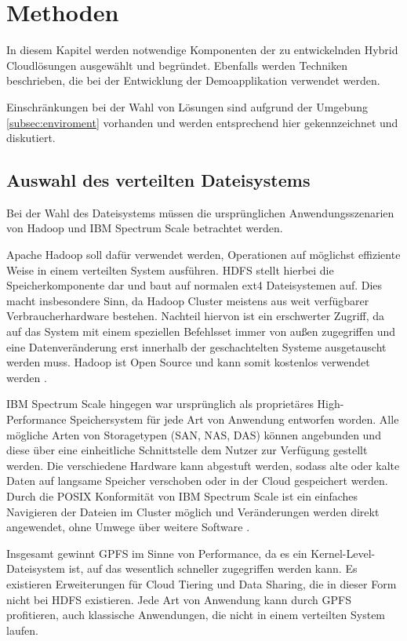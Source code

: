 \chapter{Methoden}\label{ch:methods}

In diesem Kapitel werden notwendige Komponenten der zu entwickelnden Hybrid Cloudlösungen ausgewählt und begründet. Ebenfalls werden Techniken beschrieben, die bei der Entwicklung der Demoapplikation verwendet werden. 

Einschränkungen bei der Wahl von Lösungen sind aufgrund der Umgebung \ref{subsec:enviroment} vorhanden und werden entsprechend hier gekennzeichnet und diskutiert.

\section{Auswahl des verteilten Dateisystems}
Bei der Wahl des Dateisystems müssen die ursprünglichen Anwendungsszenarien von Hadoop und IBM Spectrum Scale betrachtet werden. 

Apache Hadoop soll dafür verwendet werden, Operationen auf möglichst effiziente Weise in einem verteilten System ausführen. \acs{HDFS} stellt hierbei die Speicherkomponente dar und baut auf normalen ext4 Dateisystemen auf. Dies macht insbesondere Sinn, da Hadoop Cluster meistens aus weit verfügbarer Verbraucherhardware bestehen. Nachteil hiervon ist ein erschwerter Zugriff, da auf das System mit einem speziellen Befehlsset immer von außen zugegriffen und eine Datenveränderung erst innerhalb der geschachtelten Systeme ausgetauscht werden muss.
Hadoop ist Open Source und kann somit kostenlos verwendet werden \parencite{snowflake.2016}. 

IBM Spectrum Scale hingegen war ursprünglich als proprietäres High-Performance Speichersystem für jede Art von Anwendung entworfen worden. Alle mögliche Arten von Storagetypen (\acs{SAN}, \acs{NAS}, \acs{DAS}) können angebunden und diese über eine einheitliche Schnittstelle dem Nutzer zur Verfügung gestellt werden. Die verschiedene Hardware kann abgestuft werden, sodass alte oder kalte Daten auf langsame Speicher verschoben oder in der Cloud gespeichert werden.  Durch die \gls{POSIX} Konformität von IBM Spectrum Scale ist ein einfaches Navigieren der Dateien im Cluster möglich und Veränderungen werden direkt angewendet, ohne Umwege über weitere Software \parencite{snowflake.2016}.

Insgesamt gewinnt \acs{GPFS} im Sinne von Performance, da es ein Kernel-Level-Dateisystem ist, auf das wesentlich schneller zugegriffen werden kann. Es existieren Erweiterungen für Cloud Tiering und Data Sharing, die in dieser Form nicht bei HDFS existieren. Jede Art von Anwendung kann durch \acs{GPFS} profitieren, auch klassische Anwendungen, die nicht in einem verteilten System laufen.

